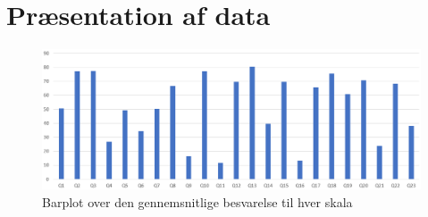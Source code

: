 \section{Præsentation af data}
\label{TestAfSkalaPraesentationAfData}
%
\begin{figure}[H]
\centering
\includegraphics[width = \textwidth]{Figure/DatabehandlingSkalaer/BarPlotRaaData} 
\caption{Barplot over den gennemsnitlige besvarelse til hver skala}
\label{fig:BarPlot}
\end{figure}
\noindent
%